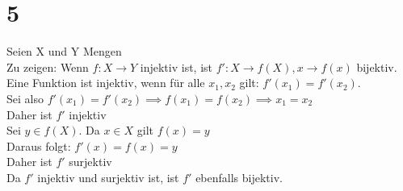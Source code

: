 \documentclass{article}
\begin{document}
\section{5}
Seien X und Y Mengen \\
Zu zeigen: Wenn $f:X \rightarrow Y$ injektiv ist, ist $f':X \rightarrow f(X), x\rightarrow f(x)$ bijektiv. \\ 
Eine Funktion ist injektiv, wenn für alle $x_1, x_2$ gilt: $f'(x_1)=f'(x_2)$. \\
Sei also $f'(x_1) = f'(x_2) \implies f(x_1) = f(x_2) \implies x_1 = x_2$  \\
Daher ist $f'$ injektiv \\
Sei $y \in f(X)$. Da $x \in X$ gilt $f(x)=y$ \\
Daraus folgt: $f'(x) = f(x) = y$ \\
Daher ist $f'$ surjektiv \\
Da $f'$ injektiv und surjektiv ist, ist $f'$ ebenfalls bijektiv. \\
\end{document}
